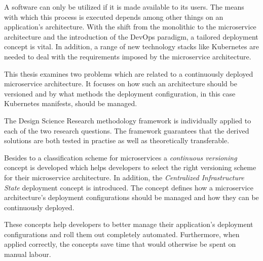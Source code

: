 
A software can only be utilized if it is made available to its users. The means
with which this process is executed depends among other things on an
application's architecture. With the shift from the monolithic to the
microservice architecture and the introduction of the DevOps paradigm, a
tailored deployment concept is vital. In addition, a range of new technology
stacks like Kubernetes are needed to deal with the requirements imposed by the
microservice architecture.

This thesis examines two problems which are related to a continuously deployed
microservice architecture. It focuses on how such an architecture should be
versioned and by what methods the deployment configuration, in this case
Kubernetes manifests, should be managed.

The Design Science Research methodology framework is individually applied to
each of the two research questions. The framework guarantees that the derived
solutions are both tested in practise as well as theoretically transferable.

Besides to a classification scheme for microservices a \textit{continuous
versioning} concept is developed which helps developers to select the right
versioning scheme for their microservice architecture. In addition, the
\textit{Centralized Infrastructure State} deployment concept is introduced.
The concept defines how a microservice architecture's deployment configurations
should be managed and how they can be continuously deployed.

These concepts help developers to better manage their application's deployment
configurations and roll them out completely automated. Furthermore, when
applied correctly, the concepts save time that would otherwise be spent on
manual labour.
